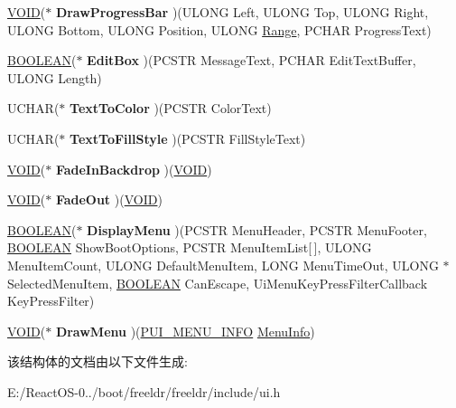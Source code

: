 \begin{DoxyCompactItemize}
\item 
\mbox{\label{structtag_u_i_v_t_b_l_ac1e417d54ff1bb48e75107fd395e10b9}} 
\hyperlink{interfacevoid}{V\+O\+ID}($\ast$ {\bfseries Draw\+Progress\+Bar} )(U\+L\+O\+NG Left, U\+L\+O\+NG Top, U\+L\+O\+NG Right, U\+L\+O\+NG Bottom, U\+L\+O\+NG Position, U\+L\+O\+NG \hyperlink{structtag_range}{Range}, P\+C\+H\+AR Progress\+Text)
\item 
\mbox{\label{structtag_u_i_v_t_b_l_a6842abc99049ff3cfa9301b5b21556f3}} 
\hyperlink{_processor_bind_8h_a112e3146cb38b6ee95e64d85842e380a}{B\+O\+O\+L\+E\+AN}($\ast$ {\bfseries Edit\+Box} )(P\+C\+S\+TR Message\+Text, P\+C\+H\+AR Edit\+Text\+Buffer, U\+L\+O\+NG Length)
\item 
\mbox{\label{structtag_u_i_v_t_b_l_af8861edf1c53a011c0cc74955666dabe}} 
U\+C\+H\+AR($\ast$ {\bfseries Text\+To\+Color} )(P\+C\+S\+TR Color\+Text)
\item 
\mbox{\label{structtag_u_i_v_t_b_l_a546d6f0127c67f9aeffeb41c9bae1823}} 
U\+C\+H\+AR($\ast$ {\bfseries Text\+To\+Fill\+Style} )(P\+C\+S\+TR Fill\+Style\+Text)
\item 
\mbox{\label{structtag_u_i_v_t_b_l_a22d5a8f70a4381605f5a887d0954c96f}} 
\hyperlink{interfacevoid}{V\+O\+ID}($\ast$ {\bfseries Fade\+In\+Backdrop} )(\hyperlink{interfacevoid}{V\+O\+ID})
\item 
\mbox{\label{structtag_u_i_v_t_b_l_ae5f105e9883bba519b6a0fcdfc665703}} 
\hyperlink{interfacevoid}{V\+O\+ID}($\ast$ {\bfseries Fade\+Out} )(\hyperlink{interfacevoid}{V\+O\+ID})
\item 
\mbox{\label{structtag_u_i_v_t_b_l_ae7f368721ad84ea683b504c009905f0a}} 
\hyperlink{_processor_bind_8h_a112e3146cb38b6ee95e64d85842e380a}{B\+O\+O\+L\+E\+AN}($\ast$ {\bfseries Display\+Menu} )(P\+C\+S\+TR Menu\+Header, P\+C\+S\+TR Menu\+Footer, \hyperlink{_processor_bind_8h_a112e3146cb38b6ee95e64d85842e380a}{B\+O\+O\+L\+E\+AN} Show\+Boot\+Options, P\+C\+S\+TR Menu\+Item\+List\mbox{[}$\,$\mbox{]}, U\+L\+O\+NG Menu\+Item\+Count, U\+L\+O\+NG Default\+Menu\+Item, L\+O\+NG Menu\+Time\+Out, U\+L\+O\+NG $\ast$Selected\+Menu\+Item, \hyperlink{_processor_bind_8h_a112e3146cb38b6ee95e64d85842e380a}{B\+O\+O\+L\+E\+AN} Can\+Escape, Ui\+Menu\+Key\+Press\+Filter\+Callback Key\+Press\+Filter)
\item 
\mbox{\label{structtag_u_i_v_t_b_l_a35163f6137817a1fb4f30ca959e6507b}} 
\hyperlink{interfacevoid}{V\+O\+ID}($\ast$ {\bfseries Draw\+Menu} )(\hyperlink{structtag_u_i___m_e_n_u___i_n_f_o}{P\+U\+I\+\_\+\+M\+E\+N\+U\+\_\+\+I\+N\+FO} \hyperlink{struct_menu_info}{Menu\+Info})
\end{DoxyCompactItemize}


该结构体的文档由以下文件生成\+:\begin{DoxyCompactItemize}
\item 
E\+:/\+React\+O\+S-\/0../boot/freeldr/freeldr/include/ui.\+h\end{DoxyCompactItemize}
